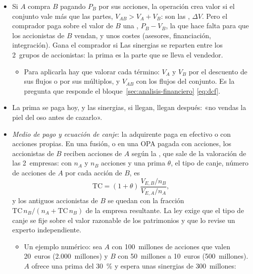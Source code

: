 \documentclass[11pt]{article}
\begin{document}
\begin{itemize}
\item Si $A$ compra $B$ pagando $P_B$ por sus acciones, la operación crea valor si el conjunto vale más que las partes, $V_{AB}>V_A+V_B$: son las , $\Delta V$. Pero el comprador paga sobre el valor de $B$ una , $P_B-V_B$, la que hace falta para que los accionistas de $B$ vendan, y unos costes (asesores, financiación, integración). Gana el comprador si
  Las sinergias se reparten entre los 2~grupos de accionistas: la prima es la parte que se lleva el vendedor.
  \begin{itemize}
  \item Para aplicarla hay que valorar cada término: $V_A$ y $V_B$ por el descuento de sus flujos o por sus múltiplos, y $V_{AB}$ con los flujos del conjunto. Es la pregunta que responde el bloque~\ref{sec:analisis-financiero} \eqref{eq:dcf}.
  \end{itemize}
\item La prima se paga hoy, y las sinergias, si llegan, llegan después: «no vendas la piel del oso antes de cazarlo».
\item \emph{Medio de pago y ecuación de canje}: la adquirente paga en efectivo o con acciones propias. En una fusión, o en una OPA pagada con acciones, los accionistas de $B$ reciben acciones de $A$ según la , que sale de la valoración de las 2~empresas: con $n_A$ y $n_B$ acciones y una prima $\theta$, el tipo de canje, número de acciones de $A$ por cada acción de $B$, es
  \begin{equation}\label{eq:canje}
  \mathrm{TC}=(1+\theta)\,\frac{V_{E,B}/n_B}{V_{E,A}/n_A},
  \end{equation}
  y los antiguos accionistas de $B$ se quedan con la fracción $\mathrm{TC}\,n_B/(n_A+\mathrm{TC}\,n_B)$ de la empresa resultante. La ley exige que el tipo de canje se fije sobre el valor razonable de los patrimonios y que lo revise un experto independiente\nocite{BOE2023RDL5}.
  \begin{itemize}
  \item Un ejemplo numérico: sea $A$ con 100~millones de acciones que valen 20~euros (2.000~millones) y $B$ con 50~millones a 10~euros (500~millones). $A$ ofrece una prima del 30~\% y espera unas sinergias de 300~millones:
    \begin{itemize}

\end{itemize}
\end{itemize}
\end{itemize}
\end{document}
